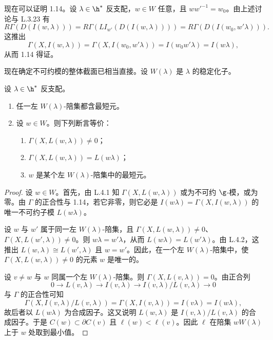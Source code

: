 现在可以证明 1.14。设 $\lambda\in\h^*$ 反支配，$w\in W$ 任意，且 $ww'^{-1}=w_0$。由上述讨论与 L.3.23 有
$$R\Gamma(D(I(w,\lambda)))=R\Gamma(LI_{w'}(D(I(w,\lambda))))=R\Gamma(D(I(w_0,w'\lambda))).$$
这推出
$$\Gamma(X,I(w,\lambda))=\Gamma(X,I(w_0,w'\lambda))=I(w_0w'\lambda)=I(w\lambda),$$
从而 1.14 得证。

现在确定不可约模的整体截面已相当直接。设 $W(\lambda)$ 是 $\lambda$ 的稳定化子。

\begin{theorem}\label{thm:05.1.19}
设 $\lambda\in\h^*$ 反支配。
\begin{enumerate}[label=(\roman*)]
\item 任一左 $W(\lambda)$-陪集都含最短元。
\item 设 $w\in W$。则下列断言等价：
\begin{enumerate}[label=(\alph*)]
\item $\Gamma(X,L(w,\lambda))\neq0$；
\item $\Gamma(X,L(w,\lambda))=L(w\lambda)$；
\item $w$ 是某个左 $W(\lambda)$-陪集中的最短元。
\end{enumerate}
\end{enumerate}
\end{theorem}

\begin{proof}
设 $w\in W$。首先，由 L.4.1 知 $\Gamma(X,L(w,\lambda))$ 或为不可约 $\g$-模，或为零。由 $\Gamma$ 的正合性与 1.14，若它非零，则它必是 $I(w\lambda)=\Gamma(X,I(w,\lambda))$ 的唯一不可约子模 $L(w\lambda)$。

设 $w$ 与 $w'$ 属于同一左 $W(\lambda)$-陪集，且 $\Gamma(X,L(w,\lambda))\neq0$、$\Gamma(X,L(w',\lambda))\neq0$。则 $w\lambda=w'\lambda$，从而 $L(w\lambda)=L(w'\lambda)$。由 L.4.2，这推出 $L(w,\lambda)\cong L(w',\lambda)$ 且 $w=w'$。因此，在一个左 $W(\lambda)$-陪集中，使 $\Gamma(X,L(w,\lambda))\neq0$ 的元素 $w$ 是唯一的。

设 $v\neq w$ 与 $w$ 同属一个左 $W(\lambda)$-陪集。则 $\Gamma(X,L(v,\lambda))=0$。由正合列
$$0\longrightarrow L(v,\lambda)\longrightarrow I(v,\lambda)\longrightarrow I(v,\lambda)/L(v,\lambda)\longrightarrow0$$
与 $\Gamma$ 的正合性可知
$$\Gamma(X,I(v,\lambda)/L(v,\lambda))=\Gamma(X,I(v,\lambda))=I(v\lambda)=I(w\lambda),$$
故后者以 $L(w\lambda)$ 为合成因子。这又说明 $L(w,\lambda)$ 是 $I(v,\lambda)/L(v,\lambda)$ 的合成因子。于是 $C(w)\subset\partial C(v)$ 且 $\ell(w)<\ell(v)$。因此 $\ell$ 在陪集 $wW(\lambda)$ 上于 $w$ 处取到最小值。
\end{proof}

